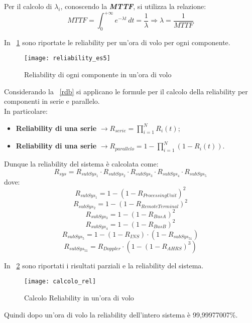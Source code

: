 Per il calcolo di $\lambda_i$, conoscendo la \textbf{\textit{MTTF}}, si utilizza
la relazione:
$$ MTTF = \int_{0}^{+\infty} e^{-\lambda t}\, dt = \frac{1}{\lambda}  \Longrightarrow \lambda = \frac{1}{MTTF} $$

In \figurename~\ref{reliability_es5} sono riportate le reliability per un'ora di
volo per ogni componente.\\

\begin{figure}[!htbp]
  \centering
  \texttt{[image: reliability\_es5]}
  \caption{Reliability di ogni componente in un'ora di volo}
  \label{reliability_es5}
\end{figure}

Considerando la \figurename~\ref{rdb} si applicano le formule per il calcolo
della reliability per componenti in serie e parallelo.\\
In particolare:
\begin{itemize}
  \item \textbf{Reliability di una serie} $\rightarrow R_{serie} = \prod_{i=1}^{N}{R_i(t)}$;
  \item \textbf{Reliability di una serie} $\rightarrow R_{parallelo} = 1 - \prod_{i=1}^{N}{(1- R_i(t))}$.
\end{itemize}

Dunque la reliability del sistema è calcolata come:
$$ R_{sys} = R_{subSys_1} \cdot R_{subSys_2} \cdot R_{subSys_3} \cdot R_{subSys_4} \cdot R_{subSys_5}$$
dove:
$$R_{subSys_1} = 1 - (1 - R_{ProcessingUnit})^2$$
$$R_{subSys_2} = 1 - (1 - R_{RemoteTerminal})^2$$
$$R_{subSys_3} = 1 - (1 - R_{BusA})^2$$
$$R_{subSys_4} = 1 - (1 - R_{BusB})^2$$
$$R_{subSys_5} = 1 - (1 - R_{INS}) \cdot (1 - R_{subSys_51})$$
$$R_{subSys_51} = R_{Doppler} \cdot (1 - (1 - R_{AHRS})^3)$$

\clearpage

In \figurename~\ref{calcolo_rel} sono riportati i risultati parziali e la
reliability del sistema.\\

\begin{figure}[!htbp]
  \centering
  \texttt{[image: calcolo\_rel]}
  \caption{Calcolo Reliability in un'ora di volo}
  \label{calcolo_rel}
\end{figure}

Quindi dopo un'ora di volo la reliability dell'intero sistema è 99,99977007\%.\\

\clearpage


